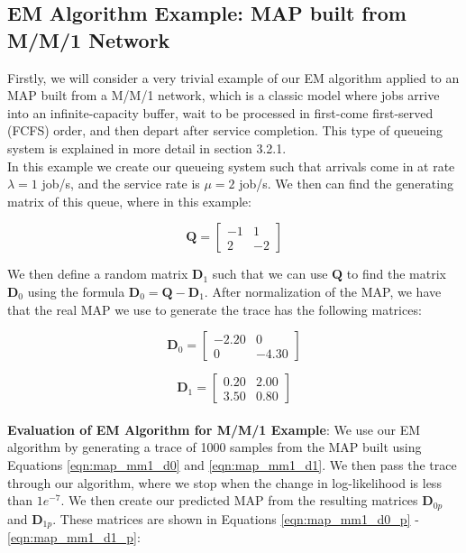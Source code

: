 \documentclass[a4paper,11pt,titlepage]{article}
\begin{document}
\subsection{EM Algorithm Example: MAP built from M/M/1 Network}

Firstly, we will consider a very trivial example of our EM algorithm applied to an MAP built from a M/M/1 network, which is a classic model where jobs arrive into an infinite-capacity buffer, wait to be processed in first-come first-served (FCFS) order, and then depart after service completion. This type of queueing system is explained in more detail in section 3.2.1. \\

In this example we create our queueing system such that arrivals come in at rate $\lambda = 1$ job/s, and the service rate is $\mu = 2$ job/s. We then can find the generating matrix of this queue, where in this example: 

\begin{equation}
    \mathbf{Q} = \begin{bmatrix}
    -1 & 1 \\
    2 & -2
    \end{bmatrix}
\end{equation}

We then define a random matrix $\mathbf{D}_1$ such that we can use $\mathbf{Q}$ to find the matrix $\mathbf{D}_0$ using the formula $\mathbf{D}_0 = \mathbf{Q} - \mathbf{D}_1$. After normalization of the MAP, we have that the real MAP we use to generate the trace has the following matrices: 

\begin{equation}
    \mathbf{D}_0 = \begin{bmatrix}
    -2.20 & 0 \\
    0 & -4.30
    \end{bmatrix}
    \label{eqn:map_mm1_d0}
\end{equation}

\begin{equation}
    \mathbf{D}_1 = \begin{bmatrix}
    0.20 & 2.00 \\
    3.50 & 0.80
    \end{bmatrix}
    \label{eqn:map_mm1_d1}
\end{equation} \\

\textbf{Evaluation of EM Algorithm for M/M/1 Example}: We use our EM algorithm by generating a trace of 1000 samples from the MAP built using Equations \ref{eqn:map_mm1_d0} and \ref{eqn:map_mm1_d1}. We then pass the trace through our algorithm, where we stop when the change in log-likelihood is less than $1e^{-7}$. We then create our predicted MAP from the resulting matrices $\mathbf{D}_{0p}$ and $\mathbf{D}_{1p}$. These matrices are shown in Equations \ref{eqn:map_mm1_d0_p} - \ref{eqn:map_mm1_d1_p}: 
\end{document}
